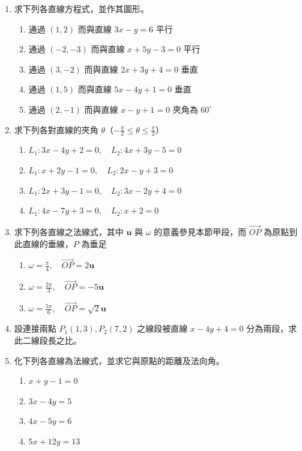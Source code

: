 \begin{enumerate}[label=\arabic*., leftmargin=2em]
  \item 求下列各直線方程式，並作其圖形。
  \begin{enumerate}[label=(\roman*), leftmargin=2em]
    \item 通過 $(1, 2)$ 而與直線 $3x - y = 6$ 平行
    \item 通過 $(-2, -3)$ 而與直線 $x + 5y - 3 = 0$ 平行
    \item 通過 $(3, -2)$ 而與直線 $2x + 3y + 4 = 0$ 垂直
    \item 通過 $(1, 5)$ 而與直線 $5x - 4y + 1 = 0$ 垂直
    \item 通過 $(2, -1)$ 而與直線 $x - y + 1 = 0$ 夾角為 $60^\circ$
  \end{enumerate}
  
  \item 求下列各對直線的夾角 $\theta$（$-\frac{\pi}{2} \le \theta \le \frac{\pi}{2}$）
  \begin{enumerate}[label=(\roman*), leftmargin=2em]
    \item $L_1 : 3x - 4y + 2 = 0, \quad L_2 : 4x + 3y - 5 = 0$
    \item $L_1 : x + 2y - 1 = 0, \quad L_2 : 2x - y + 3 = 0$
    \item $L_1 : 2x + 3y - 1 = 0, \quad L_2 : 3x - 2y + 4 = 0$
    \item $L_1 : 4x - 7y + 3 = 0, \quad L_2 : x + 2 = 0$
  \end{enumerate}
  
  \item 求下列各直線之法線式，其中 $\mathbf{u}$ 與 $\omega$ 的意義參見本節甲段，而 $\vec{OP}$ 為原點到此直線的垂線，$P$ 為垂足
  \begin{enumerate}[label=(\roman*), leftmargin=2em]
    \item $\omega = \frac{\pi}{4}, \quad \vec{OP} = 2\mathbf{u}$
    \item $\omega = \frac{2\pi}{3}, \quad \vec{OP} = -5\mathbf{u}$
    \item $\omega = \frac{5\pi}{6}, \quad \vec{OP} = \sqrt{2}\mathbf{u}$
  \end{enumerate}
  
  \item 設連接兩點 $P_1(1, 3), P_2(7, 2)$ 之線段被直線 $x - 4y + 4 = 0$ 分為兩段，求此二線段長之比。
  
  \item 化下列各直線為法線式，並求它與原點的距離及法向角。
  \begin{enumerate}[label=(\roman*), leftmargin=2em]
    \item $x + y - 1 = 0$
    \item $3x - 4y = 5$
    \item $4x - 5y = 6$
    \item $5x + 12y = 13$
  \end{enumerate}
  

\end{enumerate}
